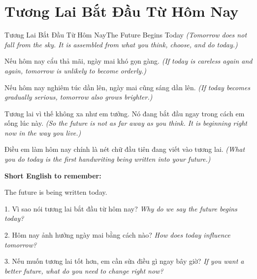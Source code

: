 \section{Tương Lai Bắt Đầu Từ Hôm Nay}
\begin{truyen}{Tương Lai Bắt Đầu Từ Hôm Nay}{The Future Begins Today}
\textit{(Tomorrow does not fall from the sky. It is assembled from what you think, choose, and do today.)}

Nếu hôm nay cẩu thả mãi, ngày mai khó gọn gàng.
\textit{(If today is careless again and again, tomorrow is unlikely to become orderly.)}

Nếu hôm nay nghiêm túc dần lên, ngày mai cũng sáng dần lên.
\textit{(If today becomes gradually serious, tomorrow also grows brighter.)}

Tương lai vì thế không xa như em tưởng. Nó đang bắt đầu ngay trong cách em sống lúc này.
\textit{(So the future is not as far away as you think. It is beginning right now in the way you live.)}
\end{truyen}

\begin{baihoc}
Điều em làm hôm nay chính là nét chữ đầu tiên đang viết vào tương lai.
\textit{(What you do today is the first handwriting being written into your future.)}
\end{baihoc}

\begin{ghinhoanh}
\textbf{Short English to remember:}

The future is being written today.

\end{ghinhoanh}

\begin{tuhocnhanh}
1. Vì sao nói tương lai bắt đầu từ hôm nay? \textit{Why do we say the future begins today?}

2. Hôm nay ảnh hưởng ngày mai bằng cách nào? \textit{How does today influence tomorrow?}

3. Nếu muốn tương lai tốt hơn, em cần sửa điều gì ngay bây giờ? \textit{If you want a better future, what do you need to change right now?}
\end{tuhocnhanh}
\ngancach
